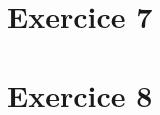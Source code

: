 \documentclass[12pt, letterpaper]{article}
\begin{document}
\section*{Exercice 7}

\section*{Exercice 8}
\end{document}
